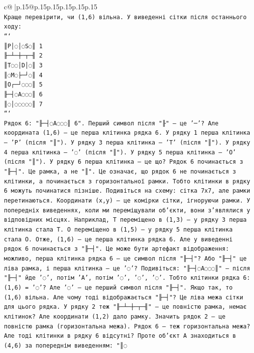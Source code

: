\documentclass{article}
\begin{document}
{\begin{supertabular}{c@{$\;$}|p{.15\linewidth}@{}p{.15\linewidth}p{.15\linewidth}p{.15\linewidth}p{.15\linewidth}p{.15\linewidth}}
{{{\\ 
\texttt{Краще перевірити, чи (1,6) вільна. У виведенні сітки після останнього ходу: } \\
\texttt{```} \\
\texttt{║P│◌│◌S◌║ 1} \\
\texttt{╟─┴─┼─┬─╢ 2} \\
\texttt{║T◌◌│D│◌║ 3} \\
\texttt{║◌M◌├─┘◌║ 4} \\
\texttt{║O┌─┘◌◌◌║ 5} \\
\texttt{╟─┤◌A◌◌◌║ 6} \\
\texttt{║◌│◌◌◌◌◌║ 7} \\
\texttt{```} \\
\texttt{Рядок 6: "╟─┤◌A◌◌◌║ 6". Перший символ після "╟" — це '─'? Але координата (1,6) — це перша клітинка рядка 6. У рядку 1 перша клітинка — 'P' (після "║"). У рядку 3 перша клітинка — 'T' (після "║"). У рядку 4 перша клітинка — '◌' (після "║"). У рядку 5 перша клітинка — 'O' (після "║"). У рядку 6 перша клітинка — це що? Рядок 6 починається з "╟─┤". Це рамка, а не "║". Це означає, що рядок 6 не починається з клітинки, а починається з горизонтальної рамки. Тобто клітинки в рядку 6 можуть починатися пізніше. Подивіться на схему: сітка 7x7, але рамки перетинаються. Координати (x,y) — це комірки сітки, ігноруючи рамки. У попередніх виведеннях, коли ми переміщували об'єкти, вони з'являлися у відповідних місцях. Наприклад, T переміщено в (1,3) — у рядку 3 перша клітинка стала T. O переміщено в (1,5) — у рядку 5 перша клітинка стала O. Отже, (1,6) — це перша клітинка рядка 6. Але у виведенні рядок 6 починається з "╟─┤". Це може бути артефакт відображення: можливо, перша клітинка рядка 6 — це символ після "╟─┤"? Або "╟─┤" це ліва рамка, і перша клітинка — це '◌'? Подивіться: "╟─┤◌A◌◌◌║" — після "╟─┤" йде '◌', потім 'A', потім '◌', '◌', '◌'. Тобто клітинки рядка 6: (1,6) = '◌'? Але '◌' — це перший символ після "╟─┤". Якщо так, то (1,6) вільна. Але чому тоді відображається "╟─┤"? Це ліва межа сітки для цього рядка. У рядку 2 теж "╟─┴─┼─┬─╢" — це повністю рамка, немає клітинок? Але координати (1,2) дало рамку. Значить рядок 2 — це повністю рамка (горизонтальна межа). Рядок 6 — теж горизонтальна межа? Але тоді клітинки в рядку 6 відсутні? Проте об'єкт A знаходиться в (4,6) за попереднім виведенням: "║◌} \\
            }
        }
    }
     \\ \\


\end{supertabular}}
\end{document}
